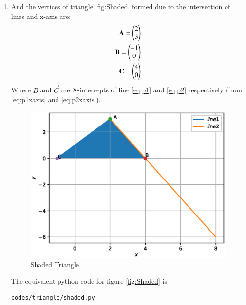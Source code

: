 \begin{enumerate}[label=\arabic*.,ref=\thesubsection.\theenumi]
\item And the vertices of triangle \eqref{fig:Shaded} formed due to the intersection of lines and x-axis are:
\begin{align}
\mathbf{A}=\begin{pmatrix}2\\3\end{pmatrix}
\\
\mathbf{B}=\begin{pmatrix}-1\\0\end{pmatrix}
\\
\mathbf{C}=\begin{pmatrix}4\\0\end{pmatrix}
\end{align}
Where $\vec{B}$ and $\vec{C}$ are X-intercepts of line \eqref{eq:p1} and \eqref{eq:p2} respectively (from \eqref{eq:p1xaxis} and \eqref{eq:p2xaxis}).
\begin{figure}[!ht]
\includegraphics[width=\columnwidth]{./figs/triangle/shaded.eps}
\caption{Shaded Triangle}
\label{fig:Shaded}
\end{figure}
The equivalent python code for figure \eqref{fig:Shaded} is
%
\begin{lstlisting}
codes/triangle/shaded.py
\end{lstlisting}

\end{enumerate}